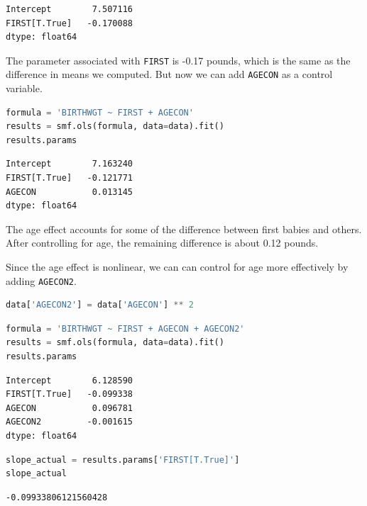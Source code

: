 \begin{lstlisting}[style=output]
Intercept        7.507116
FIRST[T.True]   -0.170088
dtype: float64
\end{lstlisting}

The parameter associated with \passthrough{\lstinline!FIRST!} is -0.17
pounds, which is the same as the difference in means we computed. But
now we can add \passthrough{\lstinline!AGECON!} as a control variable.

\begin{lstlisting}[language=Python,style=source]
formula = 'BIRTHWGT ~ FIRST + AGECON'
results = smf.ols(formula, data=data).fit()
results.params
\end{lstlisting}

\begin{lstlisting}[style=output]
Intercept        7.163240
FIRST[T.True]   -0.121771
AGECON           0.013145
dtype: float64
\end{lstlisting}

The age effect accounts for some of the difference between first babies
and others. After controlling for age, the remaining difference is about
0.12 pounds.

Since the age effect is nonlinear, we can can control for age more
effectively by adding \passthrough{\lstinline!AGECON2!}.

\begin{lstlisting}[language=Python,style=source]
data['AGECON2'] = data['AGECON'] ** 2
\end{lstlisting}

\begin{lstlisting}[language=Python,style=source]
formula = 'BIRTHWGT ~ FIRST + AGECON + AGECON2'
results = smf.ols(formula, data=data).fit()
results.params
\end{lstlisting}

\begin{lstlisting}[style=output]
Intercept        6.128590
FIRST[T.True]   -0.099338
AGECON           0.096781
AGECON2         -0.001615
dtype: float64
\end{lstlisting}

\begin{lstlisting}[language=Python,style=source]
slope_actual = results.params['FIRST[T.True]']
slope_actual
\end{lstlisting}

\begin{lstlisting}[style=output]
-0.09933806121560428
\end{lstlisting}

